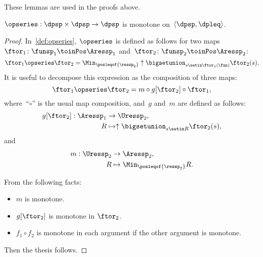 These lemmas are used in the proofs above.
\begin{lemma}
    \label{lem:series-monotone}$\opseries:\dpsp\times\dpsp\rightarrow\dpsp$
    is monotone on~$\langle\dpsp,\dpleq\rangle$.
\end{lemma}
\begin{proof}
    In~\cref{def:opseries}, $\opseries$ is defined as follows
    for two maps~$\ftor_{1}\colon\funsp_{1}\toinPos\Aressp_{1}$ and~$\ftor_{2}\colon\funsp_{2}\toinPos\Aressp_{2}$:
    \[
        {\displaystyle \ftor_{1}\opseries\ftor_{2}=\Min_{\posleqof{\ressp_{2}}}\uparrow\bigsetunion_{s\setin\ftor_{1}(\fun)}\ftor_{2}(s)}.
    \]
    It is useful to decompose this expression as the composition of three
    maps:
    \[
        \ftor_{1}\opseries\ftor_{2}=m\circ g[\ftor_{2}]\circ\ftor_{1},
    \]
    where~``$\circ$'' is the usual map composition, and~$g$ and~$m$
    are defined as follows:
    \begin{align*}
        g[\ftor_{2}]:\Aressp_{1} & \rightarrow\Uressp_{2}, \\
        R                        & \mapsto\uparrow\bigsetunion_{s\setin R}\ftor_{2}(s),
    \end{align*}
    and
    \begin{align*}
        m:\Uressp_{2} & \to \Aressp_{2}, \\
        R             & \mapsto\Min_{\posleqof{\ressp_{2}}}
        R.
    \end{align*}

    From the following facts:
    \begin{itemize}
        \item $m$ is monotone.
        \item $g[\ftor_{2}]$ is monotone in $\ftor_{2}$.
        \item $f_{1}\circ f_{2}$ is monotone in each argument if the other argument
              is monotone.
    \end{itemize}
    Then the thesis follows.
\end{proof}

